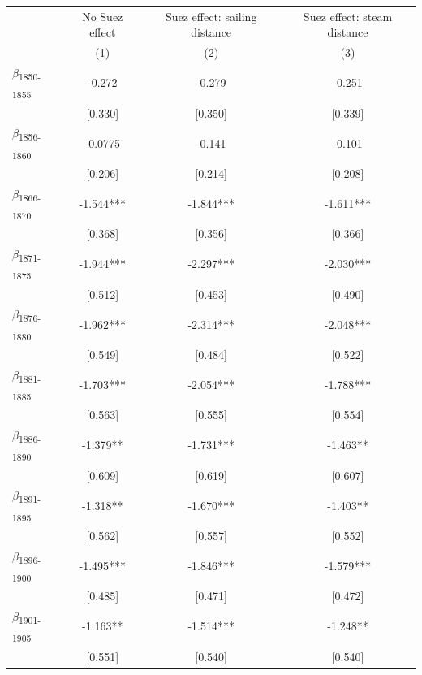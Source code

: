 {
\def\sym#1{\ifmmode^{#1}\else\(^{#1}\)\fi}
\begin{tabular}{l*{3}{c}}
\toprule
            &No Suez effect   &Suez effect: sailing distance   &Suez effect: steam distance   \\
            &\multicolumn{1}{c}{(1)}   &\multicolumn{1}{c}{(2)}   &\multicolumn{1}{c}{(3)}   \\
\midrule
$\beta$\textsubscript{1850-1855}&      -0.272   &      -0.279   &      -0.251   \\
            &     [0.330]   &     [0.350]   &     [0.339]   \\
$\beta$\textsubscript{1856-1860}&     -0.0775   &      -0.141   &      -0.101   \\
            &     [0.206]   &     [0.214]   &     [0.208]   \\
$\beta$\textsubscript{1866-1870}&      -1.544***&      -1.844***&      -1.611***\\
            &     [0.368]   &     [0.356]   &     [0.366]   \\
$\beta$\textsubscript{1871-1875}&      -1.944***&      -2.297***&      -2.030***\\
            &     [0.512]   &     [0.453]   &     [0.490]   \\
$\beta$\textsubscript{1876-1880}&      -1.962***&      -2.314***&      -2.048***\\
            &     [0.549]   &     [0.484]   &     [0.522]   \\
$\beta$\textsubscript{1881-1885}&      -1.703***&      -2.054***&      -1.788***\\
            &     [0.563]   &     [0.555]   &     [0.554]   \\
$\beta$\textsubscript{1886-1890}&      -1.379** &      -1.731***&      -1.463** \\
            &     [0.609]   &     [0.619]   &     [0.607]   \\
$\beta$\textsubscript{1891-1895}&      -1.318** &      -1.670***&      -1.403** \\
            &     [0.562]   &     [0.557]   &     [0.552]   \\
$\beta$\textsubscript{1896-1900}&      -1.495***&      -1.846***&      -1.579***\\
            &     [0.485]   &     [0.471]   &     [0.472]   \\
$\beta$\textsubscript{1901-1905}&      -1.163** &      -1.514***&      -1.248** \\
            &     [0.551]   &     [0.540]   &     [0.540]   \\

\end{tabular}}
